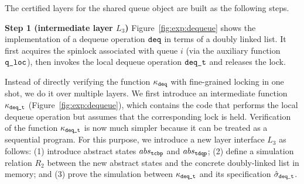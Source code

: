 {

The certified layers for the shared queue object
are built as the following steps.

\noindent\textbf{Step 1 (intermediate layer $L_3$)} 
Figure~\ref{fig:exp:dequeue} shows
the implementation of a dequeue operation ${\texttt{deq}}$ in terms of a doubly linked
list.
It first acquires the spinlock associated with queue $i$
(via the auxiliary function ${\texttt{q\_loc}}$),
then invokes the local dequeue operation ${\texttt{deq}}{\texttt{\_t}}$
and releases the lock.
Instead of directly verifying the function $\kappa_{{\texttt{deq}}}$
with fine-grained locking in one shot, we do it over
multiple layers.
We first introduce an intermediate function
$\kappa_{{\texttt{deq}}{\texttt{\_t}}}$ (\cf Figure~\ref{fig:exp:dequeue}), which contains
the code that performs the local dequeue operation but assumes that
the corresponding lock is held.
Verification of the function $\kappa_{{\texttt{deq}}{\texttt{\_t}}}$ is now much
simpler because it can be treated as a sequential program.
For this purpose, we introduce a new layer interface $L_3$ as follows:
(1) introduce abstract states $abs_{\texttt{tcbp}}$ and $abs_{\texttt{tdqp}}$;
(2) define a simulation relation $R_{2}$ between the new abstract states
and the concrete doubly-linked list in memory;
and (3) prove the simulation between
$\kappa_{{\texttt{deq}}{\texttt{\_t}}}$ and its specification
$\hat{\sigma}_{{\texttt{deq}}{\texttt{\_t}}}$.

}
